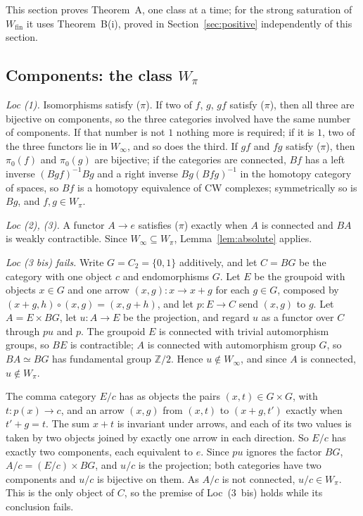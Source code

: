 \documentclass[11pt,a4paper]{article}
\theoremstyle{definition}
\newcommand{\Winf}{W_{\infty}}
\newcommand{\Wpi}{W_{\pi}}
\newcommand{\Wfin}{W_{\mathrm{fin}}}
\newcommand{\Z}{\mathbb{Z}}
\begin{document}
This section proves Theorem~A, one class at a time; for the strong saturation of $\Wfin$ it
uses Theorem~B(i), proved in Section~\ref{sec:positive} independently of this section.

\subsection{Components: the class \texorpdfstring{$\Wpi$}{W pi}}\label{subsec:wpi}

\emph{Loc (1).} Isomorphisms satisfy ($\pi$). If two of $f$, $g$, $gf$ satisfy ($\pi$), then
all three are bijective on components, so the three categories involved have the same number
of components. If that number is not $1$ nothing more is required; if it is $1$, two of the
three functors lie in $\Winf$, and so does the third. If $gf$ and $fg$ satisfy ($\pi$), then
$\pi_0(f)$ and $\pi_0(g)$ are bijective; if the categories are connected, $Bf$ has a left
inverse $(Bgf)^{-1}Bg$ and a right inverse $Bg(Bfg)^{-1}$ in the homotopy category of spaces,
so $Bf$ is a homotopy equivalence of CW complexes; symmetrically so is $Bg$, and $f,g\in\Wpi$.

\emph{Loc (2), (3).} A functor $A\to e$ satisfies ($\pi$) exactly when $A$ is connected and
$BA$ is weakly contractible. Since $\Winf\subseteq\Wpi$, Lemma~\ref{lem:absolute} applies.

\emph{Loc (3 bis) fails.} Write $G=C_2=\{0,1\}$ additively, and let $C=BG$ be the category with
one object $c$ and endomorphisms $G$. Let $E$ be the groupoid with objects $x\in G$ and one
arrow $(x,g)\colon x\to x+g$ for each $g\in G$, composed by
$(x+g,h)\circ(x,g)=(x,g+h)$, and let $p\colon E\to C$ send $(x,g)$ to $g$. Let
$A=E\times BG$, let $u\colon A\to E$ be the projection, and regard $u$ as a functor over $C$
through $pu$ and $p$. The groupoid $E$ is connected with trivial automorphism groups, so $BE$
is contractible; $A$ is connected with automorphism group $G$, so $BA\simeq BG$ has
fundamental group $\Z/2$. Hence $u\notin\Winf$, and since $A$ is connected, $u\notin\Wpi$.

The comma category $E/c$ has as objects the pairs $(x,t)\in G\times G$, with $t\colon p(x)\to
c$, and an arrow $(x,g)$ from $(x,t)$ to $(x+g,t')$ exactly when $t'+g=t$. The sum $x+t$ is
invariant under arrows, and each of its two values is taken by two objects joined by exactly
one arrow in each direction. So $E/c$ has exactly two components, each equivalent to $e$. Since
$pu$ ignores the factor $BG$, $A/c=(E/c)\times BG$, and $u/c$ is the projection; both
categories have two components and $u/c$ is bijective on them. As $A/c$ is not connected,
$u/c\in\Wpi$. This is the only object of $C$, so the premise of Loc~(3~bis) holds while its
conclusion fails.
\end{document}
